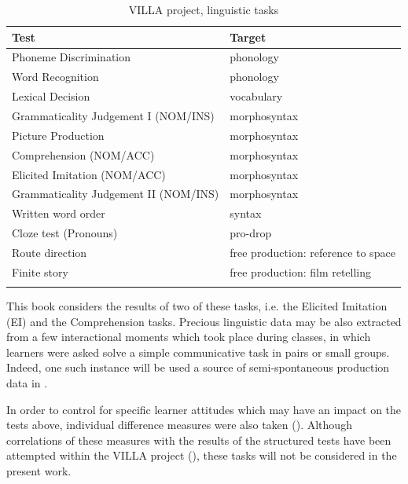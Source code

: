\begin{table}
    \begin{tabularx}{\textwidth}{ll}
    \lsptoprule
        Test & Target\\
    \midrule
        Phoneme Discrimination & phonology\\
        Word Recognition & phonology\\
        Lexical Decision & vocabulary\\
        Grammaticality Judgement I (NOM/INS) & morphosyntax\\
        Picture Production & morphosyntax\\
        Comprehension (NOM/ACC) & morphosyntax\\
        Elicited Imitation (NOM/ACC) & morphosyntax\\
        Grammaticality Judgement II (NOM/INS) & morphosyntax\\
        Written word order & syntax\\
        Cloze test (Pronouns) & pro-drop\\
        Route direction & free production: reference to space\\
        Finite story \citep{Dimroth2012} & free production: film retelling\\
    \lspbottomrule
    \end{tabularx}
    \caption{VILLA project, linguistic tasks}
    \label{tab:02:9}
\end{table}

This book considers the results of two of these tasks, i.e. the Elicited Imitation (EI) and the Comprehension tasks. Precious linguistic data may be also extracted from a few interactional moments which took place during classes, in which learners were asked solve a simple communicative task in pairs or small groups. Indeed, one such instance will be used a source of semi-spontaneous production data in .

In order to control for specific learner attitudes which may have an impact on the tests above, individual difference measures were also taken (). Although correlations of these measures with the results of the structured tests have been attempted within the VILLA project (\citealt{WatorekSaturno2016, SaturnoWatorekInPrep}), these tasks will not be considered in the present work. 

